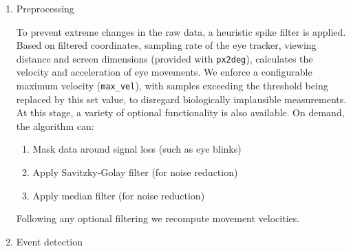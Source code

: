 \begin{enumerate}
\item{Preprocessing}

 To prevent extreme changes in the raw data, a heuristic spike filter \citep{stampe1993} is applied. Based on filtered coordinates, sampling rate of the eye tracker, viewing distance and screen dimensions (provided with \texttt{px2deg}), \remodnav calculates the velocity and acceleration of eye movements. We enforce a configurable maximum velocity (\texttt{max\_vel}), with samples exceeding the threshold being replaced by this set value, to disregard biologically implausible measurements.
 At this stage, a variety of optional functionality is also available. On demand, the algorithm can: 
 \begin{enumerate}
 	\item Mask data around signal loss (such as eye blinks)
 	\item Apply Savitzky-Golay filter (for noise reduction) 
 	\item Apply median filter (for noise reduction)
 \end{enumerate}
 Following any optional filtering we recompute movement velocities. \\

\item{Event detection}


\end{enumerate}
